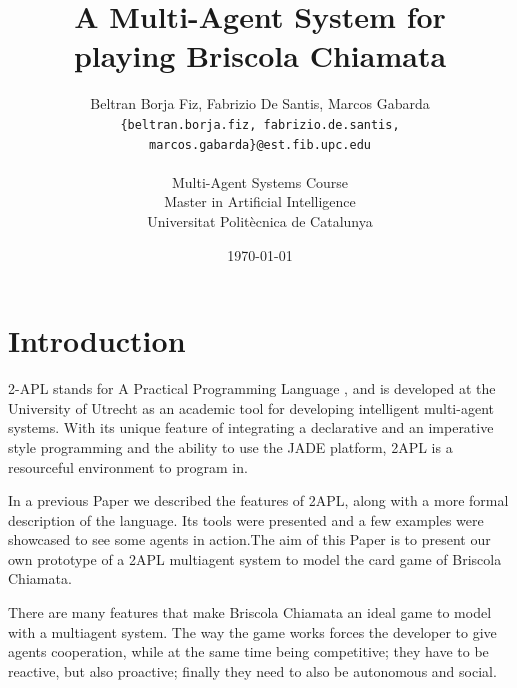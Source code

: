 \documentclass[a4paper]{article}
\begin{document}
\title{A Multi-Agent System for\\ playing Briscola Chiamata}
 
\author{Beltran Borja Fiz, Fabrizio De Santis, Marcos Gabarda\\
\small \texttt{\{beltran.borja.fiz, fabrizio.de.santis, marcos.gabarda\}@est.fib.upc.edu}\\
\\
Multi-Agent Systems Course\\
Master in Artificial Intelligence\\
Universitat Polit\`ecnica de Catalunya}
\date{\today}

\newenvironment{fminipage}%
  {\begin{Sbox}\begin{minipage}}%
  {\end{minipage}\end{Sbox}\fbox{\TheSbox}}

\maketitle

\tableofcontents

\newpage

\section{Introduction}\label{sec:intro}

2-APL stands for A Practical Programming Language , and is developed at the University of Utrecht as an academic tool for developing intelligent multi-agent systems. With its unique feature of integrating a declarative and an imperative style programming and the ability to use the JADE platform, 2APL is a resourceful environment to program in.

In a previous Paper we described the features of 2APL, along with a more formal description of the language. Its tools were presented and a few examples were showcased to see some agents in action.The aim of this Paper is to present our own prototype of a 2APL multiagent system to model the card game of Briscola Chiamata. 

There are many features that make Briscola Chiamata an ideal game to model with a multiagent system. The way the game works forces the developer to give agents cooperation, while at the same time being competitive; they have to be reactive, but also proactive; finally they need to also be autonomous and social.
\end{document}
